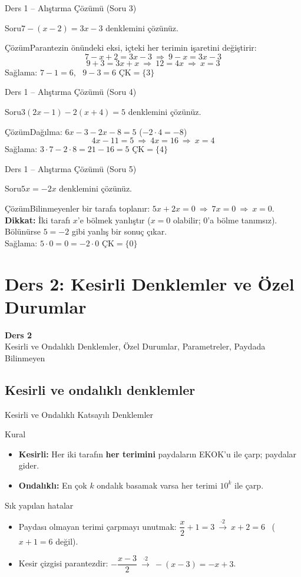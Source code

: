 \documentclass[aspectratio=169,11pt,handout]{beamer}
\newcommand{\soru}[3]{%
\begin{frame}{#1}
  \begin{block}{Soru}\large #2\end{block}
  \pause
  \begin{exampleblock}{Çözüm}\large #3\end{exampleblock}
\end{frame}}
\begin{document}
\soru{Ders 1 -- Alıştırma Çözümü (Soru 3)}
{\(7-(x-2)=3x-3\) denklemini çözünüz.}
{Parantezin önündeki eksi, içteki her terimin işaretini değiştirir:
\[7-x+2=3x-3\ \Rightarrow\ 9-x=3x-3\]
\[9+3=3x+x\ \Rightarrow\ 12=4x\ \Rightarrow\ x=3\]
Sağlama: \(7-1=6\), \ \(9-3=6\) \checkmark \qquad \(\text{ÇK}=\{3\}\)}

\soru{Ders 1 -- Alıştırma Çözümü (Soru 4)}
{\(3(2x-1)-2(x+4)=5\) denklemini çözünüz.}
{Dağılma: \(6x-3-2x-8=5\) \quad (\(-2\cdot 4=-8\))
\[4x-11=5\ \Rightarrow\ 4x=16\ \Rightarrow\ x=4\]
Sağlama: \(3\cdot 7-2\cdot 8=21-16=5\) \checkmark \qquad \(\text{ÇK}=\{4\}\)}

\soru{Ders 1 -- Alıştırma Çözümü (Soru 5)}
{\(5x=-2x\) denklemini çözünüz.}
{Bilinmeyenler bir tarafa toplanır: \(5x+2x=0\ \Rightarrow\ 7x=0\ \Rightarrow\ x=0\).\\[3pt]
\textbf{Dikkat:} İki tarafı \(x\)'e bölmek yanlıştır (\(x=0\) olabilir; \(0\)'a bölme tanımsız). Bölünürse \(5=-2\) gibi yanlış bir sonuç çıkar.\\[3pt]
Sağlama: \(5\cdot 0=0=-2\cdot 0\) \checkmark \qquad \(\text{ÇK}=\{0\}\)}

\section{Ders 2: Kesirli Denklemler ve Özel Durumlar}
\begin{frame}
\centering\Large\color{anamavi}\textbf{Ders 2}\\[6pt]\normalsize Kesirli ve Ondalıklı Denklemler, Özel Durumlar, Parametreler, Paydada Bilinmeyen
\end{frame}

\subsection{Kesirli ve ondalıklı denklemler}
\begin{frame}{Kesirli ve Ondalıklı Katsayılı Denklemler}
\begin{block}{Kural}
\begin{itemize}
\item \textbf{Kesirli:} Her iki tarafın \textbf{her terimini} paydaların EKOK'u ile çarp; paydalar gider.
\item \textbf{Ondalıklı:} En çok \(k\) ondalık basamak varsa her terimi \(10^{k}\) ile çarp.
\end{itemize}
\end{block}
\begin{alertblock}{Sık yapılan hatalar}
\begin{itemize}
\item Paydası olmayan terimi çarpmayı unutmak: \(\dfrac{x}{2}+1=3\ \xrightarrow{\cdot 2}\ x+2=6\) \ (\(x+1=6\) değil).
\item Kesir çizgisi parantezdir: \(-\dfrac{x-3}{2}\ \xrightarrow{\cdot 2}\ -(x-3)=-x+3\).
\end{itemize}
\end{alertblock}
\end{frame}
\end{document}
